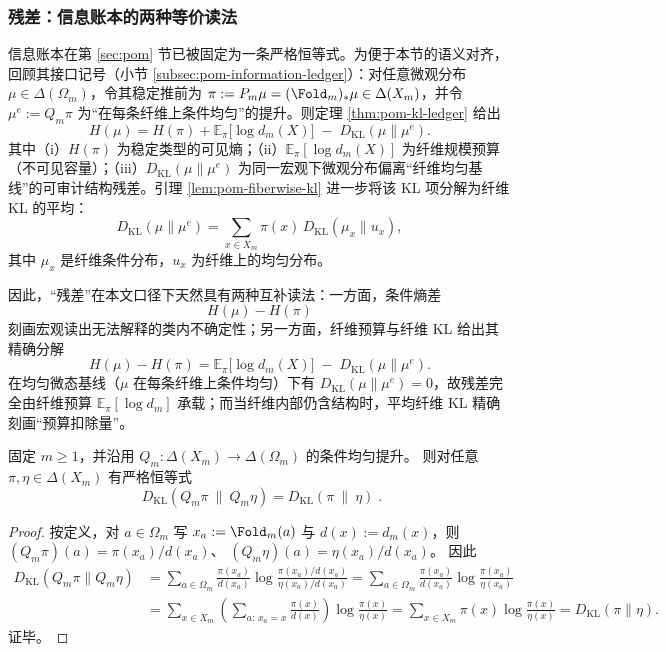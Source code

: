 \subsubsection{残差：信息账本的两种等价读法}\label{subsubsec:frt-residual-ledger}
信息账本在第 \ref{sec:pom} 节已被固定为一条严格恒等式。为便于本节的语义对齐，回顾其接口记号（小节 \ref{subsec:pom-information-ledger}）：对任意微观分布 \(\mu\in\Delta(\Omega_m)\)，令其稳定推前为 \(\pi:=P_m\mu=(\Fold_m)_*\mu\in\Delta(X_m)\)，并令 \(\mu^e:=Q_m\pi\) 为“在每条纤维上条件均匀”的提升。则定理 \ref{thm:pom-kl-ledger} 给出
\[
\boxed{\;
H(\mu)=H(\pi)+\mathbb{E}_{\pi}\!\bigl[\log d_m(X)\bigr]\;-\;D_{\mathrm{KL}}(\mu\|\mu^e).
\;}
\]
其中（i）\(H(\pi)\) 为稳定类型的可见熵；（ii）\(\mathbb{E}_{\pi}[\log d_m(X)]\) 为纤维规模预算（不可见容量）；（iii）\(D_{\mathrm{KL}}(\mu\|\mu^e)\) 为同一宏观下微观分布偏离“纤维均匀基线”的可审计结构残差。引理 \ref{lem:pom-fiberwise-kl} 进一步将该 KL 项分解为纤维 KL 的平均：
\[
D_{\mathrm{KL}}(\mu\|\mu^e)=\sum_{x\in X_m}\pi(x)\,D_{\mathrm{KL}}(\mu_x\|u_x),
\]
其中 \(\mu_x\) 是纤维条件分布，\(u_x\) 为纤维上的均匀分布。\par
因此，“残差”在本文口径下天然具有两种互补读法：一方面，条件熵差
\[
H(\mu)-H(\pi)
\]
刻画宏观读出无法解释的类内不确定性；另一方面，纤维预算与纤维 KL 给出其精确分解
\[
\boxed{\;
H(\mu)-H(\pi)=\mathbb{E}_{\pi}\!\bigl[\log d_m(X)\bigr]\;-\;D_{\mathrm{KL}}(\mu\|\mu^e).
\;}
\]
在均匀微态基线（\(\mu\) 在每条纤维上条件均匀）下有 \(D_{\mathrm{KL}}(\mu\|\mu^e)=0\)，故残差完全由纤维预算 \(\mathbb{E}_{\pi}[\log d_m]\) 承载；而当纤维内部仍含结构时，平均纤维 KL 精确刻画“预算扣除量”。

\begin{proposition}\label{prop:frt-conditional-uniform-lift-kl-isometry}
固定 \(m\ge 1\)，并沿用 \(Q_m:\Delta(X_m)\to\Delta(\Omega_m)\) 的条件均匀提升。
则对任意 \(\pi,\eta\in\Delta(X_m)\) 有严格恒等式
\[
\boxed{\;
D_{\mathrm{KL}}(Q_m\pi\ \|\ Q_m\eta)=D_{\mathrm{KL}}(\pi\ \|\ \eta)\; }.
\]
\end{proposition}
\begin{proof}
按定义，对 \(a\in\Omega_m\) 写 \(x_a:=\Fold_m(a)\) 与 \(d(x):=d_m(x)\)，则
\(
(Q_m\pi)(a)=\pi(x_a)/d(x_a)
\)、
\(
(Q_m\eta)(a)=\eta(x_a)/d(x_a)
\)。
因此
\[
\begin{aligned}
D_{\mathrm{KL}}(Q_m\pi\|Q_m\eta)
&=\sum_{a\in\Omega_m}\frac{\pi(x_a)}{d(x_a)}\log\frac{\pi(x_a)/d(x_a)}{\eta(x_a)/d(x_a)}
=\sum_{a\in\Omega_m}\frac{\pi(x_a)}{d(x_a)}\log\frac{\pi(x_a)}{\eta(x_a)}\\
&=\sum_{x\in X_m}\left(\sum_{a:\,x_a=x}\frac{\pi(x)}{d(x)}\right)\log\frac{\pi(x)}{\eta(x)}
=\sum_{x\in X_m}\pi(x)\log\frac{\pi(x)}{\eta(x)}
=D_{\mathrm{KL}}(\pi\|\eta).
\end{aligned}
\]
证毕。
\end{proof}

